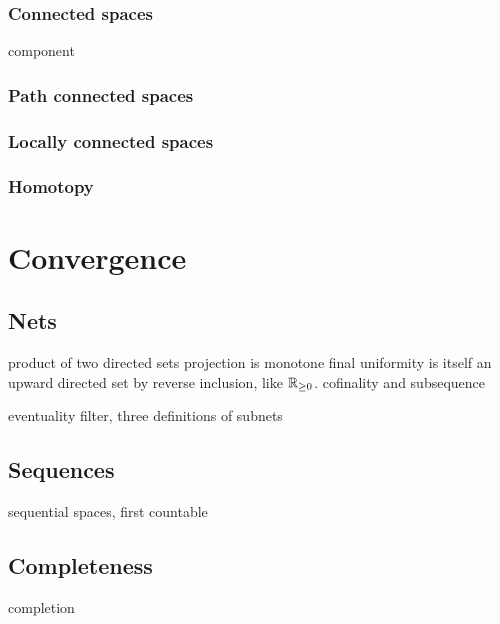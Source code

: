 \documentclass{../crs}
\begin{document}
\subsection{Connected spaces}
component
\subsection{Path connected spaces}

\subsection{Locally connected spaces}

\subsection{Homotopy}













\chapter{Convergence}

\section{Nets}

product of two directed sets
projection is monotone final
uniformity is itself an upward directed set by reverse inclusion, like $\mathbb{R}_{\ge0}$.
cofinality and subsequence

eventuality filter, three definitions of subnets

\section{Sequences}
sequential spaces, first countable

\section{Completeness}
completion
\end{document}

